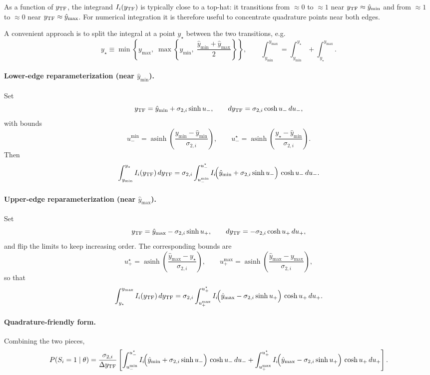 As a function of $y_{\rm TF}$, the integrand $I_i(y_{\rm TF})$ is typically
close to a top-hat: it transitions from $\approx 0$ to $\approx 1$ near
$y_{\rm TF}\approx \hat y_{\min}$ and from $\approx 1$ to $\approx 0$ near
$y_{\rm TF}\approx \hat y_{\max}$. For numerical integration it is therefore
useful to concentrate quadrature points near both edges.

A convenient approach is to split the integral at a point $y_\star$ between the
two transitions, e.g.
\[
y_\star \equiv
\min\!\left\{y_{\max},\;
\max\!\left\{y_{\min},\;\frac{\hat y_{\min}+\hat y_{\max}}{2}\right\}\right\},
\qquad
\int_{y_{\min}}^{y_{\max}}
=
\int_{y_{\min}}^{y_\star}
+
\int_{y_\star}^{y_{\max}}.
\]

\paragraph{Lower-edge reparameterization (near $\hat y_{\min}$).}
Set
\[
y_{\rm TF}=\hat y_{\min}+\sigma_{2,i}\sinh u_-,
\qquad
dy_{\rm TF}=\sigma_{2,i}\cosh u_-\,du_-,
\]
with bounds
\[
u_-^{\min}=\operatorname{asinh}\!\left(\frac{y_{\min}-\hat y_{\min}}{\sigma_{2,i}}\right),
\qquad
u_-^{\star}=\operatorname{asinh}\!\left(\frac{y_\star-\hat y_{\min}}{\sigma_{2,i}}\right).
\]
Then
\[
\int_{y_{\min}}^{y_\star} I_i(y_{\rm TF})\,dy_{\rm TF}
=
\sigma_{2,i}\int_{u_-^{\min}}^{u_-^{\star}}
I_i\!\Bigl(\hat y_{\min}+\sigma_{2,i}\sinh u_-\Bigr)\,\cosh u_-\,du_-.
\]

\paragraph{Upper-edge reparameterization (near $\hat y_{\max}$).}
Set
\[
y_{\rm TF}=\hat y_{\max}-\sigma_{2,i}\sinh u_+,
\qquad
dy_{\rm TF}=-\sigma_{2,i}\cosh u_+\,du_+,
\]
and flip the limits to keep increasing order. The corresponding bounds are
\[
u_+^{\star}=\operatorname{asinh}\!\left(\frac{\hat y_{\max}-y_\star}{\sigma_{2,i}}\right),
\qquad
u_+^{\max}=\operatorname{asinh}\!\left(\frac{\hat y_{\max}-y_{\max}}{\sigma_{2,i}}\right),
\]
so that
\[
\int_{y_\star}^{y_{\max}} I_i(y_{\rm TF})\,dy_{\rm TF}
=
\sigma_{2,i}\int_{u_+^{\max}}^{u_+^{\star}}
I_i\!\Bigl(\hat y_{\max}-\sigma_{2,i}\sinh u_+\Bigr)\,\cosh u_+\,du_+.
\]

\paragraph{Quadrature-friendly form.}
Combining the two pieces,
\begin{equation}
P(S_i=1\mid\theta)
=
\frac{\sigma_{2,i}}{\Delta y_{\rm TF}}
\left[
\int_{u_-^{\min}}^{u_-^{\star}}
I_i\!\Bigl(\hat y_{\min}+\sigma_{2,i}\sinh u_-\Bigr)\,\cosh u_-\,du_-
+
\int_{u_+^{\max}}^{u_+^{\star}}
I_i\!\Bigl(\hat y_{\max}-\sigma_{2,i}\sinh u_+\Bigr)\,\cosh u_+\,du_+
\right].
\end{equation}

